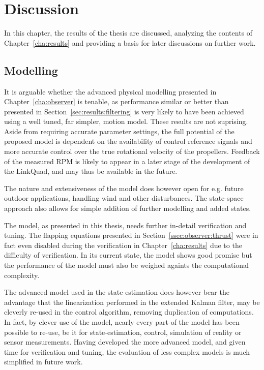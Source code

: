 \chapter{Discussion}
\label{cha:discussion}
    In this chapter, the results of the thesis are discussed,
    analyzing the contents of Chapter~\ref{cha:results} and providing
    a basis for later discussions on further work.

    \section{Modelling}
        It is arguable whether the advanced physical modelling presented
        in Chapter~\ref{cha:observer} is tenable, as performance similar or better
        than presented in Section~\ref{sec:results:filtering} is very likely
        to have been achieved using a well tuned, far simpler, motion model.
        These results are not suprising.
        Aside from requiring accurate parameter settings, the full potential of the
        proposed model is dependent on the availability of control reference
        signals and more accurate control over the true rotational velocity of
        the propellers. Feedback of the measured RPM is likely to appear in
        a later stage of the development of the LinkQuad, and may thus
        be available in the future.

        The nature and extensiveness of the model does however open
        for e.g. future outdoor applications, handling wind and other
        disturbances. The state-space approach also allows for simple addition
        of further modelling and added states.

        The model, as presented in this thesis, needs further in-detail
        verification and tuning. The flapping equations presented in
        Section~\ref{ssec:observer:thrust} were in fact even disabled during
        the verification in Chapter~\ref{cha:results} due to the
        difficulty of verification. In its current state, the model
        shows good promise but the performance of the model must also
        be weighed againts the computational complexity.

        The advanced model used in the state estimation does however bear the
        advantage that the linearization performed in the extended Kalman filter,
        may be cleverly re-used in the control algorithm, removing duplication
        of computations. In fact, by clever use of the model,
        nearly every part of the model has been possible to re-use, be it for
        state-estimation, control, simulation of reality or sensor measurements.
        Having developed the more advanced model, and given time for
        verification and tuning, the evaluation of less complex models is much
        simplified in future work.

